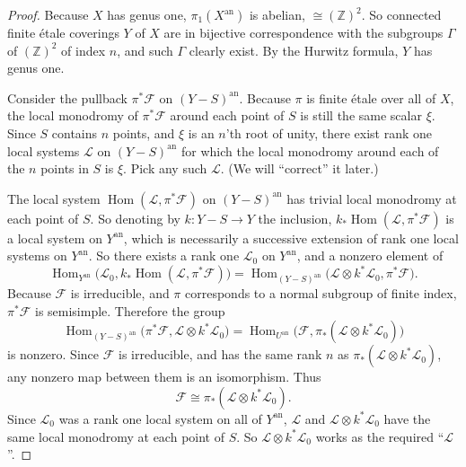 \begin{proof}
Because \(X\) has genus one, \(\pi_1(X^{\mathrm{an}})\) is abelian,
\(\cong(\mathbb{Z})^2\). So connected finite étale coverings \(Y\) of \(X\)
are in bijective correspondence with the subgroups \(\Gamma\) of
\((\mathbb{Z})^2\) of index \(n\), and such \(\Gamma\) clearly exist. By the
Hurwitz formula, \(Y\) has genus one.

Consider the pullback \(\pi^*\mathcal{F}\) on \((Y-S)^{\mathrm{an}}\). Because
\(\pi\) is finite étale over all of \(X\), the local monodromy of
\(\pi^*\mathcal{F}\) around each point of \(S\) is still the same scalar
\(\xi\). Since \(S\) contains \(n\) points, and \(\xi\) is an \(n\)'th root of
unity, there exist rank one local systems \(\mathcal{L}\) on
\((Y-S)^{\mathrm{an}}\) for which the local monodromy around each of the \(n\)
points in \(S\) is \(\xi\). Pick any such \(\mathcal{L}\). (We will ``correct''
it later.)

The local system \(\operatorname{Hom}(\mathcal{L},\pi^*\mathcal{F})\) on
\((Y-S)^{\mathrm{an}}\) has trivial local monodromy at each point of \(S\). So
denoting by \(k:Y-S\to Y\) the inclusion,
\(k_*\operatorname{Hom}(\mathcal{L},\pi^*\mathcal{F})\) is a local system on
\(Y^{\mathrm{an}}\), which is necessarily a successive extension of rank one
local systems on \(Y^{\mathrm{an}}\). So there exists a rank one
\(\mathcal{L}_0\) on \(Y^{\mathrm{an}}\), and a nonzero element of
\[
  \operatorname{Hom}_{Y^{\mathrm{an}}}
  \bigl(\mathcal{L}_0,k_*\operatorname{Hom}(\mathcal{L},\pi^*\mathcal{F})\bigr)
  =
  \operatorname{Hom}_{(Y-S)^{\mathrm{an}}}
  \bigl(\mathcal{L}\otimes k^*\mathcal{L}_0,\pi^*\mathcal{F}\bigr).
\]
Because \(\mathcal{F}\) is irreducible, and \(\pi\) corresponds to a normal
subgroup of finite index, \(\pi^*\mathcal{F}\) is semisimple. Therefore the
group
\[
  \operatorname{Hom}_{(Y-S)^{\mathrm{an}}}
  \bigl(\pi^*\mathcal{F},\mathcal{L}\otimes k^*\mathcal{L}_0\bigr)
  =
  \operatorname{Hom}_{U^{\mathrm{an}}}
  \bigl(\mathcal{F},\pi_*(\mathcal{L}\otimes k^*\mathcal{L}_0)\bigr)
\]
is nonzero. Since \(\mathcal{F}\) is irreducible, and has the same rank \(n\) as
\(\pi_*(\mathcal{L}\otimes k^*\mathcal{L}_0)\), any nonzero map between them is
an isomorphism. Thus
\[
  \mathcal{F}\cong\pi_*(\mathcal{L}\otimes k^*\mathcal{L}_0).
\]
Since \(\mathcal{L}_0\) was a rank one local system on all of \(Y^{\mathrm{an}}\),
\(\mathcal{L}\) and \(\mathcal{L}\otimes k^*\mathcal{L}_0\) have the same local
monodromy at each point of \(S\). So \(\mathcal{L}\otimes k^*\mathcal{L}_0\)
works as the required ``\(\mathcal{L}\)''.
\end{proof}

